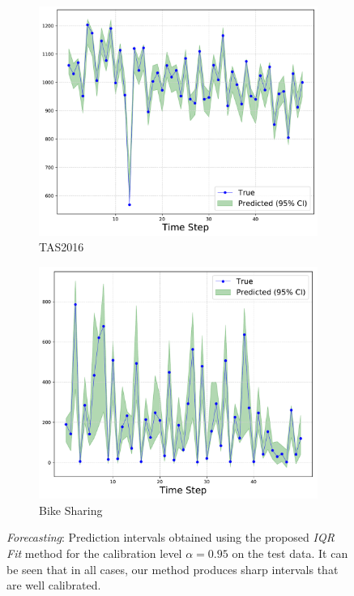 \documentclass[letterpaper]{article} %
\begin{document}
\begin{figure}[t]
\begin{subfigure}[b]{0.235\textwidth}
    \end{subfigure}
    \begin{subfigure}[b]{0.24\textwidth}
	        \centering
			\includegraphics[width=\linewidth, keepaspectratio=true]{tas2016.pdf}
		\caption{TAS2016}
	    \label{fig:tas2016}
    \end{subfigure}
    \begin{subfigure}[b]{0.24\textwidth}
	        \centering
			\includegraphics[width=\linewidth, keepaspectratio=true]{bike.pdf}
		\caption{Bike Sharing}
	    \label{fig:bike}
    \end{subfigure}
\caption{\textit{Forecasting}: Prediction intervals obtained using the proposed \textit{IQR Fit} method for the calibration level $\alpha = 0.95$ on the test data. It can be seen that in all cases, our method produces sharp intervals that are well calibrated.}
\label{fig:ts}
\end{figure}
\end{document}
